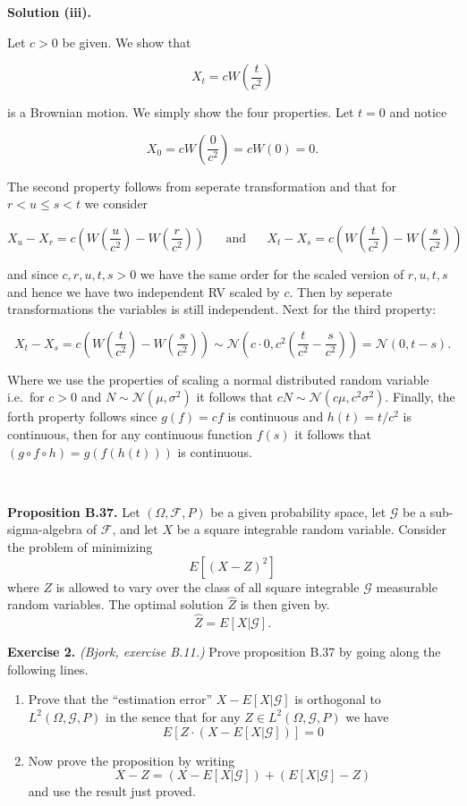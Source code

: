 \documentclass[
]{book}
\providecommand{\tightlist}{%
  \setlength{\itemsep}{0pt}\setlength{\parskip}{0pt}}
\begin{document}
\textbf{Solution (iii).}

Let \(c>0\) be given. We show that

\[X_t=cW\left(\frac{t}{c^2}\right)\]

is a Brownian motion. We simply show the four properties. Let \(t=0\) and notice

\[X_0=cW\left(\frac{0}{c^2}\right)=cW(0)=0.\]

The second property follows from seperate transformation and that for \(r<u\le s<t\) we consider

\[X_u-X_r=c\left(W\left(\frac{u}{c^2}\right)-W\left(\frac{r}{c^2}\right)\right)\hspace{20pt}\text{and}\hspace{20pt}X_t-X_s=c\left(W\left(\frac{t}{c^2}\right)-W\left(\frac{s}{c^2}\right)\right)\]

and since \(c,r,u,t,s>0\) we have the same order for the scaled version of \(r,u,t,s\) and hence we have two independent RV scaled by \(c\). Then by seperate transformations the variables is still independent. Next for the third property:

\[X_t-X_s=c\left(W\left(\frac{t}{c^2}\right)-W\left(\frac{s}{c^2}\right)\right)\sim\mathcal{N}\left(c\cdot 0,c^2\left(\frac{t}{c^2}-\frac{s}{c^2}\right)\right)=\mathcal{N}(0,t-s).\]

Where we use the properties of scaling a normal distributed random variable i.e.~for \(c>0\) and \(N\sim\mathcal{N}(\mu,\sigma ^2)\) it follows that \(c N\sim\mathcal{N}(c\mu,c^2\sigma ^2)\). Finally, the forth property follows since \(g(f)=cf\) is continuous and \(h(t)=t/c^2\) is continuous, then for any continuous function \(f(s)\) it follows that \((g \circ f\circ h)=g(f(h(t)))\) is continuous.

~

\textbf{Proposition B.37.} Let \((\Omega,\mathcal{F},P)\) be a given probability space, let \(\mathcal{G}\) be a sub-sigma-algebra of \(\mathcal{F}\), and let \(X\) be a square integrable random variable.
Consider the problem of minimizing
\[E\left[(X-Z)^2\right]\]
where \(Z\) is allowed to vary over the class of all square integrable \(\mathcal{G}\) measurable random variables. The optimal solution \(\hat{Z}\) is then given by.
\[\hat{Z}=E[X\vert\mathcal{G}].\]

\textbf{Exercise 2.} \emph{(Bjork, exercise B.11.)} Prove proposition B.37 by going along the following lines.

\begin{enumerate}
\def\labelenumi{\alph{enumi}.}
\tightlist
\item
  Prove that the ``estimation error'' \(X-E[X\vert\mathcal{G}]\) is orthogonal to \(L^2(\Omega,\mathcal{G},P)\) in the sence that for any \(Z\in L^2(\Omega,\mathcal{G},P)\) we have
  \[E[Z\cdot(X-E[X\vert\mathcal{G}])]=0\]
\item
  Now prove the proposition by writing
  \[X-Z=(X-E[X\vert\mathcal{G}])+(E[X\vert\mathcal{G}]-Z)\]
  and use the result just proved.
\end{enumerate}
\end{document}
